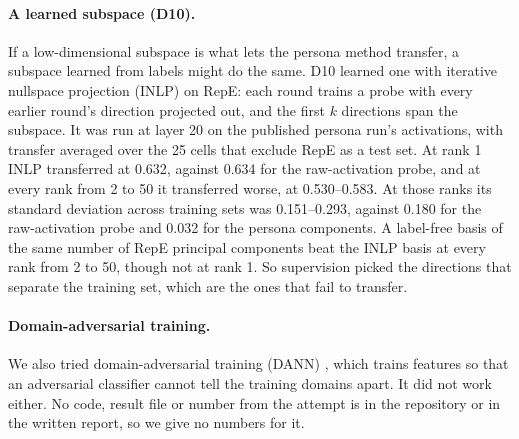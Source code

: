 \paragraph{A learned subspace (D10).}
If a low-dimensional subspace is what lets the persona method transfer, a subspace learned from labels might do the same. %
D10 learned one with iterative nullspace projection (INLP) \parencite{ravfogel2020null} on RepE: each round trains a probe with every earlier round's direction projected out, and the first $k$ directions span the subspace. %
It was run at layer 20 on the published persona run's activations, with transfer averaged over the 25 cells that exclude RepE as a test set. %
At rank 1 INLP transferred at 0.632, against 0.634 for the raw-activation probe, and at every rank from 2 to 50 it transferred worse, at 0.530--0.583. %
At those ranks its standard deviation across training sets was 0.151--0.293, against 0.180 for the raw-activation probe and 0.032 for the persona components. %
A label-free basis of the same number of RepE principal components beat the INLP basis at every rank from 2 to 50, though not at rank 1. %
So supervision picked the directions that separate the training set, which are the ones that fail to transfer. %

\paragraph{Domain-adversarial training.}
We also tried domain-adversarial training (DANN) \parencite{ganin2016domain}, which trains features so that an adversarial classifier cannot tell the training domains apart. %
It did not work either. %
No code, result file or number from the attempt is in the repository or in the written report, so we give no numbers for it. %

